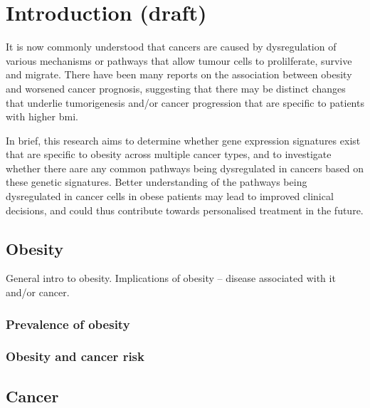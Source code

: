 \chapter{Introduction (draft)}
\label{ch:intro}


It is now commonly understood that cancers are caused by dysregulation of various mechanisms or pathways that allow tumour cells to prolilferate, survive and migrate.
There have been many reports on the association between obesity and worsened cancer prognosis, suggesting that there may be distinct changes that underlie tumorigenesis and/or cancer progression that are specific to patients with higher \gls{bmi}.

In brief, this research aims to determine whether gene expression signatures exist that are specific to obesity across multiple cancer types, and to investigate whether there aare any common pathways being dysregulated in cancers based on these genetic signatures.
Better understanding of the pathways being dysregulated in cancer cells in obese patients may lead to improved clinical decisions, and could thus contribute towards personalised treatment in the future.


\section{Obesity}
\label{sec:obesity}

General intro to obesity.
Implications of obesity -- disease associated with it and/or cancer.

\subsection{Prevalence of obesity}
\label{sub:prevalence_of_obesity}



\subsection{Obesity and cancer risk}
\label{sub:obesity_and_cancer_risk}




\section{Cancer}
\label{sec:cancer}

